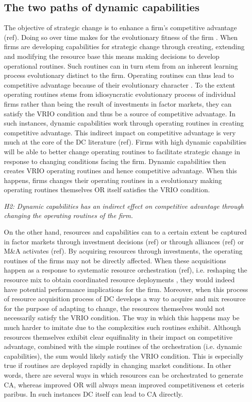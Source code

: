 \documentclass[review,fleqn]{elsarticle}\usepackage[]{graphicx}\usepackage[]{color}
\begin{document}
\subsection{The two paths of dynamic capabilities}
The objective of strategic change is to enhance a firm’s competitive advantage
(ref). Doing so over time makes for the evolutionary fitness of the firm
\citep{Helfat2007}. When firms are developing capabilities for strategic change through
creating, extending and modifying the resource base this means making decisions to develop
operational routines. Such routines can in turn stem from an inherent learning process
evolutionary distinct to the firm. Operating routines can thus lead to competitive
advantage because of their evolutionary character \citep{Nelson1982,Winter2003}. To the
extent operating routines stems from idiosyncratic evolutionary process of individual
firms rather than being the result of investments in factor markets, they can satisfy the
VRIO condition and thus be a source of competitive advantage. In such instances, dynamic
capabilities work through operating routines in creating competitive advantage. This
indirect impact on competitive advantage is very much at the core of the DC literature
(ref). Firms with high dynamic capabilities will be able to better change operating
routines to facilitate strategic change in response to changing conditions facing the
firm. Dynamic capabilities then creates VRIO operating routines and hence competitive
advantage. When this happens, firms changes their operating routines in a evolutionary
making operating routines themselves OR itself satisfies the VRIO condition.

\emph{H2: Dynamic capabilities has an indirect effect on competitive advantage through
  changing the operating routines of the firm.}

On the other hand, resources and capabilities can to a certain extent be captured in
factor markets through investment decisions (ref) or through alliances (ref) or M\&A
activates (ref). By acquiring resources through investments, the operating routines of the
firms may not be directly affected. When these acquisitions happen as a response to
systematic resource orchestration (ref), i.e. reshaping the resource mix to obtain
coordinated resource deployments \citep{Kor2005,Pan2006}, they would indeed have potential
performance implications for the firm. Moreover, when this process of resource acquisition
process of DC develops a way to acquire and mix resource for the purpose of adapting to
change, the resources themselves would not necessarily satisfy the VRIO condition. The way
in which this happens may be much harder to imitate due to the complexities such routines
exhibit. Although resources themselves exhibit clear equifinality in their impact on
competitive advantage, combined with the simple routines of the orchestration
(i.e. dynamic capabilities), the sum would likely satisfy the VRIO condition. This is
especially true if routines are deployed rapidly in changing market conditions. In other
words, there are several ways in which resources can be orchestrated to generate CA,
whereas improved OR will always mean improved competitiveness et ceteris paribus. In such
instances DC itself can lead to CA directly.
\end{document}
